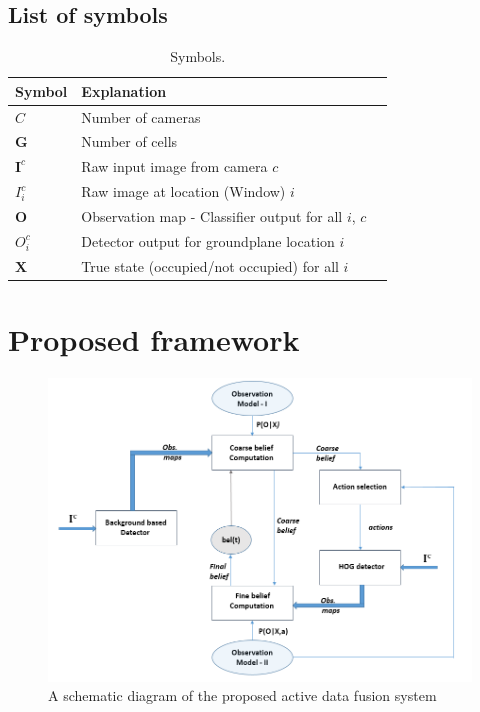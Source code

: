 \documentclass[10pt,twocolumn,letterpaper]{article}
\begin{document}
\subsection{List of symbols}
\begin{table}[ht]
  \begin{tabular}{lll}
   \hline
   Symbol & Explanation \\
   \hline
   $C $ & Number of cameras\\
   $\textbf{G} $ & Number of cells\\
   $ \textbf{I}^{c} $ & Raw input image from camera $ c$\\
   $ I_{i}^{c} $ & Raw image at location (Window) $ i$\\
   $ \textbf{O} $ & Observation map - Classifier output for all  $ i $, $ c $\\
   $O^{c}_{i} $& Detector output for groundplane location $ i $\\
   $\textbf{X}$& True state (occupied/not occupied) for all $i$\\
   \hline
  \end{tabular}
  \caption{%
    Symbols.
  }
  \label{tab:Formal symbols}
\end{table}

\section{Proposed framework}

\begin{figure}
\begin{center}
\includegraphics[width=12cm]{img/block_dia_cir.PNG}
\end{center}
   \caption{A schematic diagram of the proposed active data fusion system}
\label{fig:Block dia}
\end{figure}
\end{document}
